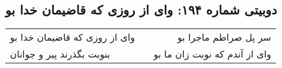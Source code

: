 \begin{center}
\section*{دوبیتی شماره ۱۹۴: وای از روزی که قاضیمان خدا بو}
\label{sec:194}
\begin{longtable}{l p{0.5cm} r}
وای از روزی که قاضیمان خدا بو
&&
سر پل صراطم ماجرا بو
\\
بنوبت بگذرند پیر و جوانان
&&
وای از آندم که نوبت زان ما بو
\\
\end{longtable}
\end{center}
